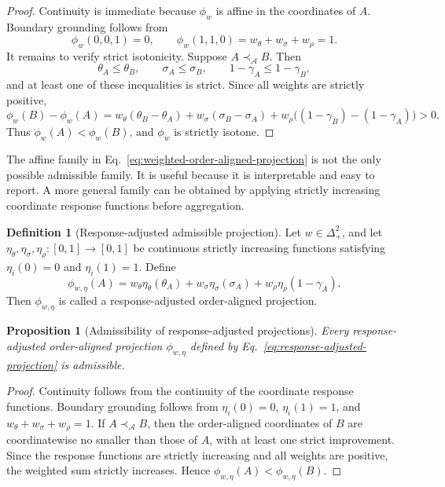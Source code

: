 \documentclass[reqno,final]{amsart}
\theoremstyle{definition}
\newtheorem{definition}{Definition}
\theoremstyle{plain}
\newtheorem{proposition}{Proposition}
\theoremstyle{remark}
\providecommand{\precA}{\prec_{\mathcal A}}
\begin{document}
\begin{proof}
Continuity is immediate because \(\phi_w\) is affine in the coordinates of \(A\). Boundary grounding follows from
\[
\phi_w(0,0,1)=0,
\qquad
\phi_w(1,1,0)=w_\theta+w_\sigma+w_\rho=1.
\]
It remains to verify strict isotonicity. Suppose \(A\precA B\). Then
\[
\theta_A\leq\theta_B,
\qquad
\sigma_A\leq\sigma_B,
\qquad
1-\gamma_A\leq1-\gamma_B,
\]
and at least one of these inequalities is strict. Since all weights are strictly positive,
\[
\phi_w(B)-\phi_w(A)
=w_\theta(\theta_B-\theta_A)+w_\sigma(\sigma_B-\sigma_A)+w_\rho\big((1-\gamma_B)-(1-\gamma_A)\big)>0.
\]
Thus \(\phi_w(A)<\phi_w(B)\), and \(\phi_w\) is strictly isotone.
\end{proof}

The affine family in Eq.~\eqref{eq:weighted-order-aligned-projection} is not the only possible admissible family. It is useful because it is interpretable and easy to report. A more general family can be obtained by applying strictly increasing coordinate response functions before aggregation.

\begin{definition}[Response-adjusted admissible projection]
Let \(w\in\Delta_+^2\), and let \(\eta_\theta,\eta_\sigma,\eta_\rho:[0,1]\to[0,1]\) be continuous strictly increasing functions satisfying \(\eta_i(0)=0\) and \(\eta_i(1)=1\). Define
\begin{equation}
\phi_{w,\eta}(A)
= w_\theta\eta_\theta(\theta_A)
+w_\sigma\eta_\sigma(\sigma_A)
+w_\rho\eta_\rho(1-\gamma_A).
\label{eq:response-adjusted-projection}
\end{equation}
Then \(\phi_{w,\eta}\) is called a response-adjusted order-aligned projection.
\end{definition}

\begin{proposition}[Admissibility of response-adjusted projections]
Every response-adjusted order-aligned projection \(\phi_{w,\eta}\) defined by Eq.~\eqref{eq:response-adjusted-projection} is admissible.
\end{proposition}

\begin{proof}
Continuity follows from the continuity of the coordinate response functions. Boundary grounding follows from \(\eta_i(0)=0\), \(\eta_i(1)=1\), and \(w_\theta+w_\sigma+w_\rho=1\). If \(A\precA B\), then the order-aligned coordinates of \(B\) are coordinatewise no smaller than those of \(A\), with at least one strict improvement. Since the response functions are strictly increasing and all weights are positive, the weighted sum strictly increases. Hence \(\phi_{w,\eta}(A)<\phi_{w,\eta}(B)\).
\end{proof}
\end{document}
